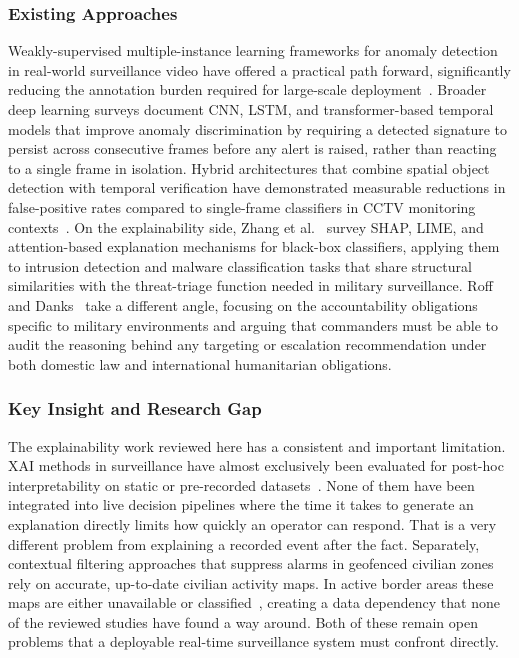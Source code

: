 \subsubsection{Existing Approaches}
Weakly-supervised multiple-instance learning frameworks for anomaly detection in real-world surveillance video have offered a practical path forward, significantly reducing the annotation burden required for large-scale deployment~\cite{deepsurvey2023anomaly}. Broader deep learning surveys document CNN, LSTM, and transformer-based temporal models that improve anomaly discrimination by requiring a detected signature to persist across consecutive frames before any alert is raised, rather than reacting to a single frame in isolation. Hybrid architectures that combine spatial object detection with temporal verification have demonstrated measurable reductions in false-positive rates compared to single-frame classifiers in CCTV monitoring contexts~\cite{cctv2024anomaly}. On the explainability side, Zhang et al.~\cite{zhang2022xai} survey SHAP, LIME, and attention-based explanation mechanisms for black-box classifiers, applying them to intrusion detection and malware classification tasks that share structural similarities with the threat-triage function needed in military surveillance. Roff and Danks~\cite{military2024xai} take a different angle, focusing on the accountability obligations specific to military environments and arguing that commanders must be able to audit the reasoning behind any targeting or escalation recommendation under both domestic law and international humanitarian obligations.

\subsubsection{Key Insight and Research Gap}
The explainability work reviewed here has a consistent and important limitation. XAI methods in surveillance have almost exclusively been evaluated for post-hoc interpretability on static or pre-recorded datasets~\cite{zhang2022xai}. None of them have been integrated into live decision pipelines where the time it takes to generate an explanation directly limits how quickly an operator can respond. That is a very different problem from explaining a recorded event after the fact. Separately, contextual filtering approaches that suppress alarms in geofenced civilian zones rely on accurate, up-to-date civilian activity maps. In active border areas these maps are either unavailable or classified~\cite{cctv2024anomaly}, creating a data dependency that none of the reviewed studies have found a way around. Both of these remain open problems that a deployable real-time surveillance system must confront directly.


